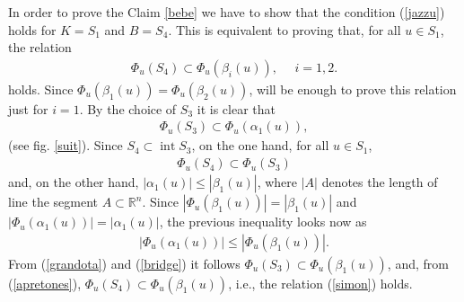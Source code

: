 \documentclass[12pt]{amsart}
\newcommand{\inte}{\operatorname*{int}}
\newcommand{\Rn}{\mathbb{R}^{n}}
\begin{document}
            In order to prove the Claim \ref{bebe} we have to show that the condition (\ref{jazzu}) 
            holds for $K=S_1$ and $B=S_4$. This is equivalent to proving that, for all $u\in S_1$, the 
            relation 
\begin{eqnarray}\label{simon}
            \Phi_u(S_4)\subset \Phi_u(\beta_i(u)), \textrm{ }\textrm{ }i=1,2.  
\end{eqnarray}
            holds. Since $\Phi_u(\beta_1(u))=\Phi_u(\beta_2(u))$, will be enough to prove this relation 
            just for $i=1$. By the choice of $S_3$ it is clear that  
\begin{eqnarray}\label{bridge}
            \Phi_u(S_3)\subset \Phi_u(\alpha_1(u)), 
\end{eqnarray}
           (see fig. \ref{suit}). Since $S_4 \subset \inte S_3$, on the one hand, for all $u\in S_1$, 
\begin{eqnarray}\label{apretones}
\Phi_u(S_4)\subset   \Phi_u(S_3)
\end{eqnarray}
and, on the other hand, 
            $|\alpha_1 (u)| \leqslant |   \beta_1(u)|$, where $|A|$ denotes the length of line the segment 
            $A\subset \Rn$. Since $|\Phi_u(\beta_1(u))|=|\beta_1(u)|$ and 
            $|\Phi_u(\alpha_1(u))|=|\alpha_1(u)|$, the previous inequality looks now as 
\begin{eqnarray}\label{grandota}
| \Phi_u(\alpha_1(u))| \leqslant |\Phi_u(  \beta_1(u))|.
\end{eqnarray}
           From (\ref{grandota}) and (\ref{bridge}) it follows $\Phi_u(S_3)\subset \Phi_u(\beta_1(u))$,
           and, from (\ref{apretones}),  $\Phi_u(S_4)\subset \Phi_u(\beta_1(u))$, i.e., the relation 
           (\ref{simon}) holds.
           
\end{document}

